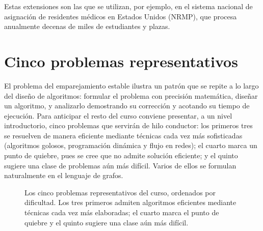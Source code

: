 \documentclass[12pt, spanish, oneside, openany]{book}
\theoremstyle{uprightplain}
\theoremstyle{definition}
\theoremstyle{remark}
\theoremstyle{definition}
\begin{document}
Estas extensiones son las que se utilizan, por ejemplo, en el sistema nacional de asignación de residentes médicos en Estados Unidos (NRMP), que procesa anualmente decenas de miles de estudiantes y plazas.

\section{Cinco problemas representativos}
\label{sec:cinco-problemas}

El problema del emparejamiento estable ilustra un patrón que se repite a lo largo del diseño de algoritmos: formular el problema con precisión matemática, diseñar un algoritmo, y analizarlo demostrando su corrección y acotando su tiempo de ejecución. Para anticipar el resto del curso conviene presentar, a un nivel introductorio, cinco problemas que servirán de hilo conductor: los primeros tres se resuelven de manera eficiente mediante técnicas cada vez más sofisticadas (algoritmos golosos, programación dinámica y flujo en redes); el cuarto marca un punto de quiebre, pues se cree que no admite solución eficiente; y el quinto sugiere una clase de problemas aún más difícil. Varios de ellos se formulan naturalmente en el lenguaje de grafos.
\begin{figure}[H]
\centering
{}
\caption{Los cinco problemas representativos del curso, ordenados por
dificultad. Los tres primeros admiten algoritmos eficientes mediante técnicas
cada vez más elaboradas; el cuarto marca el punto de quiebre y el quinto
sugiere una clase aún más difícil.}
\label{fig:cinco-problemas}
\end{figure}
\end{document}
